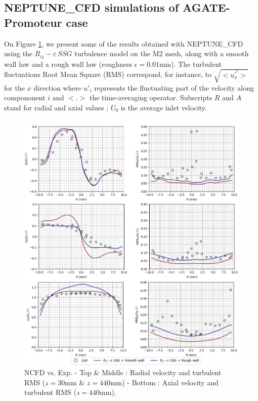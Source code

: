 \subsection{NEPTUNE\_CFD simulations of AGATE-Promoteur case}

On Figure \ref{fig:agate1}, we present some of the results obtained with NEPTUNE\_CFD using the $R_{ij}-\varepsilon~SSG$ turbulence model on the M2 mesh, along with a smooth wall law and a rough wall law (roughness $\epsilon=0.01$mm). The turbulent fluctuations Root Mean Square (RMS) correspond, for instance, to $\sqrt{<u^{'^{2}}_{x}>}$ for the $x$ direction where $u'_{i}$ represents the fluctuating part of the velocity along compononent $i$ and $<.>$ the time-averaging operator. Subscripts $R$ and $A$ stand for radial and axial values ; $U_{0}$ is the average inlet velocity.


%
\begin{figure}[!htb]
\centering
\includegraphics[scale=0.3]{img/AGATE/test.png}
\caption{NCFD vs. Exp. - Top \& Middle : Radial velocity and turbulent RMS ($z=30$mm \& $z=440$mm) -  Bottom : Axial velocity and turbulent RMS ($z=440$mm).}
\label{fig:agate1}
\end{figure}

